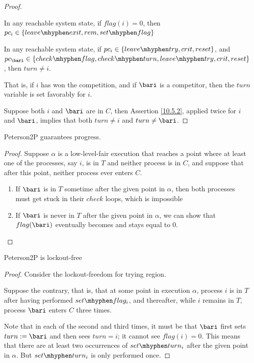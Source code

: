 \documentclass[11pt]{article}
\def \setflag {set\mhyphen flag}
\def \checkflag {check\mhyphen flag}
\def \checkturn {check\mhyphen turn}
\def \setturn {set\mhyphen turn}
\def \leavetry {leave\mhyphen try}
\def \leaveexit {leave\mhyphen exit}
\begin{document}
\begin{proof}
\begin{assertion}
In any reachable system state, if \(flag(i)=0\), then \(pc_i\in\{\leaveexit,rem,\setflag\}\)
\end{assertion}

\begin{assertion}
\label{10.5.2}
In any reachable system state, if \(pc_i\in\{\leavetry,crit,reset\}\), and
\(pc_{\bari}\in\{\checkflag,\checkturn,\leavetry,crit,reset\}\), then \(turn\neq i\).
\end{assertion}
That is, if \(i\) has won the competition, and if \(\bari\) is a competitor, then the \(turn\)
variable is set favorably for \(i\).

Suppose both \(i\) and \(\bari\) are in \(C\), then Assertion \ref{10.5.2}, applied twice for \(i\) and
\(\bari\), implies that both \(turn\neq i\) and \(turn\neq\bari\).
\end{proof}

\begin{lemma}[]
Peterson2P guarantees progress.
\end{lemma}

\begin{proof}
Suppose \(\alpha\) is a low-level-fair execution that reaches a point where at least one of the
processes, say \(i\), is in \(T\) and neither process is in \(C\), and suppose that after this point,
neither process ever enters \(C\).
\begin{enumerate}
\item If \(\bari\) is in \(T\) sometime after the given point in \(\alpha\), then both processes must get
stuck in their \(check\) loops, which is impossible
\item If \(\bari\) is never in \(T\) after the given point in \(\alpha\), we can show that
\(flag(\bari)\) eventually becomes and stays equal to 0.
\end{enumerate}
\end{proof}

\begin{lemma}[]
Peterson2P is lockout-free
\end{lemma}

\begin{proof}
Consider the lockout-freedom for trying region.

Suppose the contrary, that is, that at some point in execution \(\alpha\), process \(i\) is in \(T\)
after having performed \(\setflag_i\), and thereafter, while \(i\) remains in \(T\), process \(\bari\)
enters \(C\) three times.

Note that in each of the second and third times, it must be that \(\bari\) first sets \(turn:=\bari\)
and then sees \(turn=i\); it cannot see \(flag(i)=0\). This means that there are at least two
occurrences of \(\setturn_i\) after the given point in \(\alpha\). But \(\setturn_i\) is only
performed once.
\end{proof}
\end{document}
